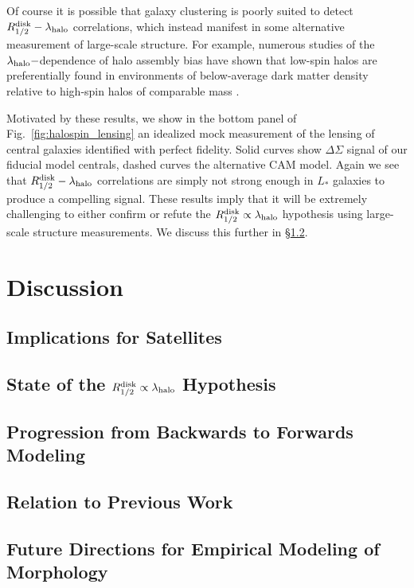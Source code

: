 \documentclass[usenatbib,usegraphicx,letterpaper]{mn2e}
\newcommand{\rhalfdisk}{R_{1/2}^{\rm disk}}
\newcommand{\halospin}{\lambda_{\rm halo}}
\begin{document}
Of course it is possible that galaxy clustering is poorly suited to detect $\rhalfdisk-\halospin$ correlations, which instead manifest in some alternative measurement of large-scale structure. For example, numerous studies of the $\halospin-$dependence of halo assembly bias have shown that low-spin halos are preferentially found in environments of below-average dark matter density relative to high-spin halos of comparable mass \citep[see, for example,][]{lee_etal17}.

Motivated by these results, we show in the bottom panel of Fig.~\ref{fig:halospin_lensing} an idealized mock measurement of the lensing of central galaxies identified with perfect fidelity. Solid curves show $\Delta\Sigma$ signal of our fiducial model centrals, dashed curves the alternative CAM model. Again we see that $\rhalfdisk-\halospin$ correlations are simply not strong enough in $L_\ast$ galaxies to produce a compelling signal. These results imply that it will be extremely challenging to either confirm or refute the $\rhalfdisk\propto\halospin$ hypothesis using large-scale structure measurements. We discuss this further in \S\ref{subsec:mo_status}.


\section{Discussion}
\label{sec:discussion}


\subsection{Implications for Satellites}
\label{subsec:satellite_discussion}

\subsection{State of the $\rhalfdisk\propto\halospin$ Hypothesis}
\label{subsec:mo_status}

\subsection{Progression from Backwards to Forwards Modeling}
\label{subsec:forwardsmodeling}

\subsection{Relation to Previous Work}
\label{subsec:previouswork}

\subsection{Future Directions for Empirical Modeling of Morphology}
\label{subsec:future}
\end{document}
